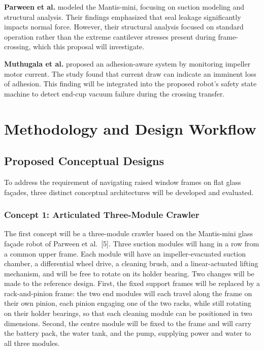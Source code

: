 \documentclass[12pt, a4paper]{article}
\begin{document}
\textbf{Parween et al.} modeled the Mantis-mini, focusing on suction modeling and structural analysis. Their findings emphasized that seal leakage significantly impacts normal force. However, their structural analysis focused on standard operation rather than the extreme cantilever stresses present during frame-crossing, which this proposal will investigate.

\textbf{Muthugala et al.} proposed an adhesion-aware system by monitoring impeller motor current. The study found that current draw can indicate an imminent loss of adhesion. This finding will be integrated into the proposed robot's safety state machine to detect end-cup vacuum failure during the crossing transfer.

\newpage

\section{Methodology and Design Workflow}

\subsection{Proposed Conceptual Designs}
To address the requirement of navigating raised window frames on flat glass façades, three distinct conceptual architectures will be developed and evaluated.

\subsubsection{Concept 1: Articulated Three-Module Crawler}
The first concept will be a three-module crawler based on the Mantis-mini glass fa\c{c}ade robot of Parween et al.~[5]. Three suction modules will hang in a row from a common upper frame. Each module will have an impeller-evacuated suction chamber, a differential wheel drive, a cleaning brush, and a linear-actuated lifting mechanism, and will be free to rotate on its holder bearing. Two changes will be made to the reference design. First, the fixed support frames will be replaced by a rack-and-pinion frame: the two end modules will each travel along the frame on their own pinion, each pinion engaging one of the two racks, while still rotating on their holder bearings, so that each cleaning module can be positioned in two dimensions. Second, the centre module will be fixed to the frame and will carry the battery pack, the water tank, and the pump, supplying power and water to all three modules.
\end{document}
